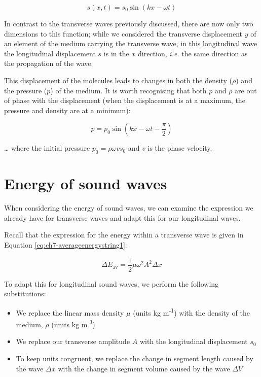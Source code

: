 \documentclass[
]{book}
\providecommand{\tightlist}{%
  \setlength{\itemsep}{0pt}\setlength{\parskip}{0pt}}
\begin{document}
\begin{equation}
s(x,t) = s_0 \sin (kx - \omega t)
\label{eq:ch9-soundwaveeq1}
\end{equation}

In contrast to the transverse waves previously discussed, there are now only two dimensions to this function; while we considered the transverse displacement \(y\) of an element of the medium carrying the transverse wave, in this longitudinal wave the longitudinal displacement \(s\) is in the \(x\) direction, \emph{i.e.} the same direction as the propagation of the wave.

This displacement of the molecules leads to changes in both the density (\(\rho\)) and the pressure (\(p\)) of the medium. It is worth recognising that both \(p\) and \(\rho\) are out of phase with the displacement (when the displacement is at a maximum, the pressure and density are at a minimum):

\begin{equation}
p = p_0 \sin (kx - \omega t - \frac{\pi}{2})
\label{eq:ch9-soundwaveeq2}
\end{equation}

\ldots{} where the initial pressure \(p_0 = \rho \omega v s_0\) and \(v\) is the phase velocity.

\hypertarget{sec:ch9-energysoundwaves}{%
\section{Energy of sound waves}\label{sec:ch9-energysoundwaves}}

When considering the energy of sound waves, we can examine the expression we already have for transverse waves and adapt this for our longitudinal waves.

Recall that the expression for the energy within a transverse wave is given in Equation \eqref{eq:ch7-averageenergystring1}:

\begin{equation}
\Delta E_{\mathrm{av}} = \frac{1}{2}\mu \omega^2 A^2 \Delta x
\end{equation}

To adapt this for longitudinal sound waves, we perform the following substitutions:

\begin{itemize}
\tightlist
\item
  We replace the linear mass density \(\mu\) (units kg m\textsuperscript{-1}) with the density of the medium, \(\rho\) (units kg m\textsuperscript{-3})
\item
  We replace our transverse amplitude \(A\) with the longitudinal displacement \(s_0\)
\item
  To keep units congruent, we replace the change in segment length caused by the wave \(\Delta x\) with the change in segment volume caused by the wave \(\Delta V\)
\end{itemize}
\end{document}
